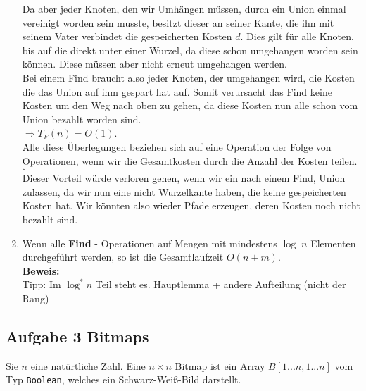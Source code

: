 \documentclass[11pt,a4paper,ngerman]{article}
\begin{document}
\begin{enumerate}[\bfseries (a)]
Da aber jeder Knoten, den wir Umhängen müssen, durch ein Union einmal vereinigt worden sein musste, besitzt dieser an seiner Kante, die ihn mit seinem Vater verbindet die gespeicherten Kosten $d$. Dies gilt für alle Knoten, bis auf die direkt unter einer Wurzel, da diese schon umgehangen worden sein können. Diese müssen aber nicht erneut umgehangen werden.\\

Bei einem Find braucht also jeder Knoten, der umgehangen wird, die Kosten die das Union auf ihm gespart hat auf. Somit verursacht das Find keine Kosten um den Weg nach oben zu gehen, da diese Kosten nun alle schon vom Union bezahlt worden sind.\\
$\Rightarrow T_F(n) = O(1)$.\\
Alle diese Überlegungen beziehen sich auf eine Operation der Folge von Operationen, wenn wir die Gesamtkosten durch die Anzahl der Kosten teilen.\\

\mbox{} \hfill $\square$\\

Dieser Vorteil würde verloren gehen, wenn wir ein nach einem Find, Union zulassen, da wir nun eine nicht Wurzelkante haben, die keine gespeicherten Kosten hat. Wir könnten also wieder Pfade erzeugen, deren Kosten noch nicht bezahlt sind.

\item Wenn alle \textbf{Find} - Operationen auf Mengen mit mindestens $\log \; n$ Elementen durchgeführt werden, so ist die Gesamtlaufzeit $O(n + m)$.\\

\textbf{Beweis:}\\

Tipp: Im $\log^* n$ Teil steht es. Hauptlemma + andere Aufteilung (nicht der Rang)

\end{enumerate}

\subsection*{Aufgabe 3 \mdseries Bitmaps}

Sie $n$ eine natürtliche Zahl. Eine $ n \times n $ Bitmap ist ein Array $B[1 ... n, 1 ... n]$ vom Typ \texttt{Boolean}, welches ein Schwarz-Weiß-Bild darstellt.
\end{document}
